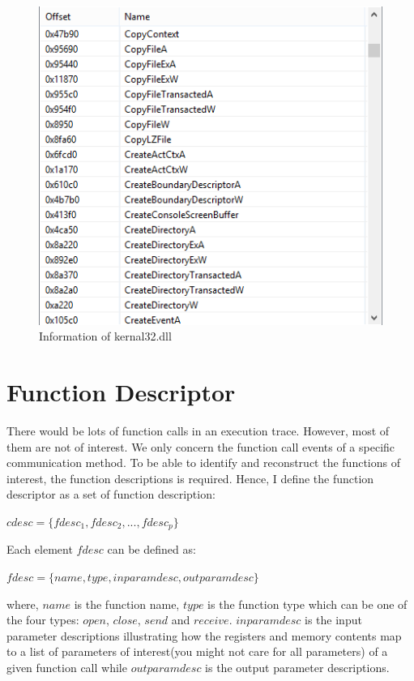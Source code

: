 \begin{figure}[H]
\centerline{\includegraphics[scale=0.6]{Figures/executable}}
\caption{Information of kernal32.dll}
\label{executable}
\end{figure}

\section{Function Descriptor}
There would be lots of function calls in an execution trace. However, most of them are not of interest. We only concern the function call events of a specific communication method. To be able to identify and reconstruct the functions of interest, the function descriptions is required. Hence, I define the function descriptor as a set of function description:

$cdesc = \lbrace fdesc_1, fdesc_2,...,fdesc_p \rbrace$

Each element $fdesc$ can be defined as:

$fdesc = \lbrace name, type, inparamdesc, outparamdesc \rbrace$

where, $name$ is the function name, $type$ is the function type which can be one of the four types: $open$, $close$, $send$ and $receive$. $inparamdesc$ is the input parameter descriptions illustrating how the registers and memory contents map to a list of parameters of interest(you might not care for all parameters) of a given function call while $outparamdesc$ is the output parameter descriptions. 

